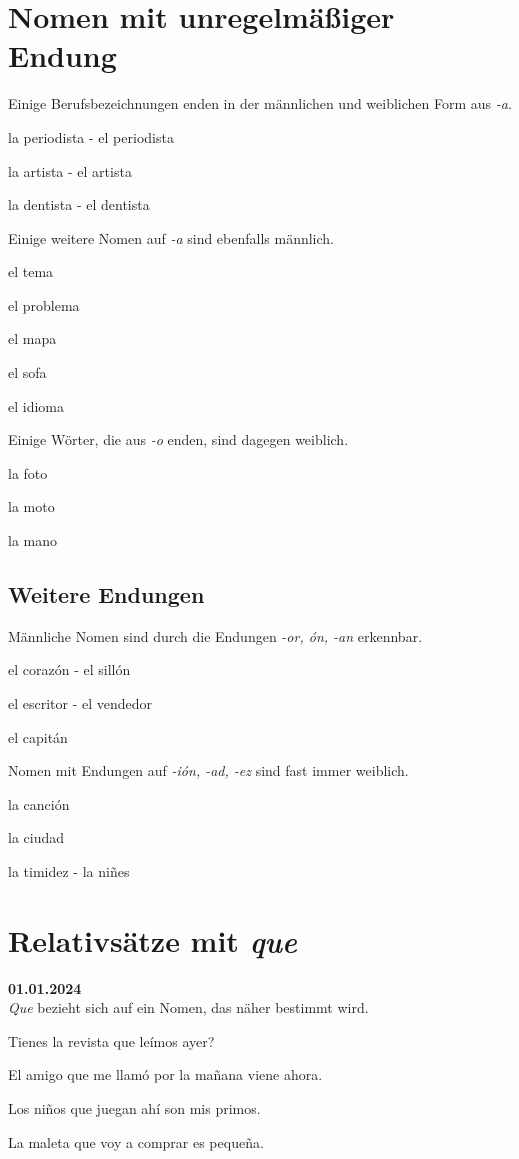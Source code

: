 \section{Nomen mit unregelmäßiger Endung}
Einige Berufsbezeichnungen enden in der männlichen und 
weiblichen Form aus \textit{-a}.
\begin{ejemplos}
    \item la periodista - el periodista
    \item la artista - el artista
    \item la dentista - el dentista
\end{ejemplos}
Einige weitere Nomen auf \textit{-a} sind ebenfalls männlich.
\begin{ejemplos}
    \item el tema
    \item el problema
    \item el mapa
    \item el sofa
    \item el idioma
\end{ejemplos}
Einige Wörter, die aus \textit{-o} enden, sind dagegen 
weiblich.
\begin{ejemplos}
    \item la foto
    \item la moto
    \item la mano
\end{ejemplos}
\subsection*{Weitere Endungen}
Männliche Nomen sind durch die Endungen \textit{-or, \'on, -an}
erkennbar.
\begin{ejemplos}
    \item el coraz\'on - el sill\'on
    \item el escritor - el vendedor
    \item el capit\'an
\end{ejemplos}
Nomen mit Endungen auf \textit{-i\'on, -ad, -ez} sind fast
immer weiblich.
\begin{ejemplos}
    \item la canci\'on
    \item la ciudad
    \item la timidez - la ni\~nes
\end{ejemplos}
\section{Relativsätze mit \textit{que}}
\textbf{01.01.2024}\\
\textit{Que} bezieht sich auf ein Nomen, das näher bestimmt
wird.
\begin{ejemplos}
    \item Tienes la revista que le\'imos ayer?
    \item El amigo que me llam\'o por la ma\~nana viene
    ahora.
    \item Los ni\~nos que juegan ah\'i son mis primos.
    \item La maleta que voy a comprar es peque\~na.
\end{ejemplos}
